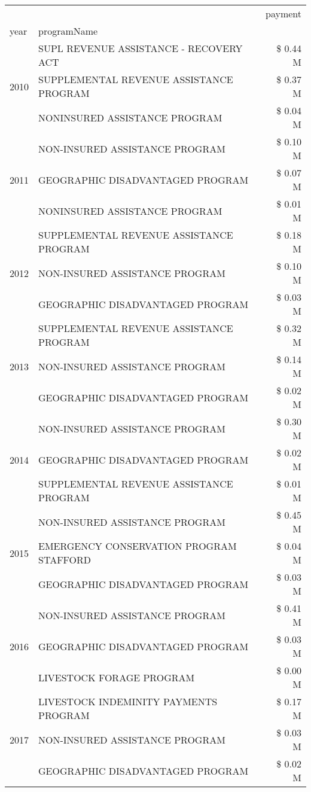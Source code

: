 \begin{tabular}{llr}
\toprule
 &  & payment \\
year & programName &  \\
\midrule
\multirow[t]{3}{*}{2010} & SUPL REVENUE ASSISTANCE - RECOVERY ACT & \$ 0.44 M \\
 & SUPPLEMENTAL REVENUE ASSISTANCE PROGRAM & \$ 0.37 M \\
 & NONINSURED ASSISTANCE PROGRAM & \$ 0.04 M \\
\cline{1-3}
\multirow[t]{3}{*}{2011} & NON-INSURED ASSISTANCE PROGRAM & \$ 0.10 M \\
 & GEOGRAPHIC DISADVANTAGED PROGRAM & \$ 0.07 M \\
 & NONINSURED ASSISTANCE PROGRAM & \$ 0.01 M \\
\cline{1-3}
\multirow[t]{3}{*}{2012} & SUPPLEMENTAL REVENUE ASSISTANCE PROGRAM & \$ 0.18 M \\
 & NON-INSURED ASSISTANCE PROGRAM & \$ 0.10 M \\
 & GEOGRAPHIC DISADVANTAGED PROGRAM & \$ 0.03 M \\
\cline{1-3}
\multirow[t]{3}{*}{2013} & SUPPLEMENTAL REVENUE ASSISTANCE PROGRAM & \$ 0.32 M \\
 & NON-INSURED ASSISTANCE PROGRAM & \$ 0.14 M \\
 & GEOGRAPHIC DISADVANTAGED PROGRAM & \$ 0.02 M \\
\cline{1-3}
\multirow[t]{3}{*}{2014} & NON-INSURED ASSISTANCE PROGRAM & \$ 0.30 M \\
 & GEOGRAPHIC DISADVANTAGED PROGRAM & \$ 0.02 M \\
 & SUPPLEMENTAL REVENUE ASSISTANCE PROGRAM & \$ 0.01 M \\
\cline{1-3}
\multirow[t]{3}{*}{2015} & NON-INSURED ASSISTANCE PROGRAM & \$ 0.45 M \\
 & EMERGENCY CONSERVATION PROGRAM STAFFORD & \$ 0.04 M \\
 & GEOGRAPHIC DISADVANTAGED PROGRAM & \$ 0.03 M \\
\cline{1-3}
\multirow[t]{3}{*}{2016} & NON-INSURED ASSISTANCE PROGRAM & \$ 0.41 M \\
 & GEOGRAPHIC DISADVANTAGED PROGRAM & \$ 0.03 M \\
 & LIVESTOCK FORAGE PROGRAM & \$ 0.00 M \\
\cline{1-3}
\multirow[t]{3}{*}{2017} & LIVESTOCK INDEMINITY PAYMENTS PROGRAM & \$ 0.17 M \\
 & NON-INSURED ASSISTANCE PROGRAM & \$ 0.03 M \\
 & GEOGRAPHIC DISADVANTAGED PROGRAM & \$ 0.02 M \\

\end{tabular}
